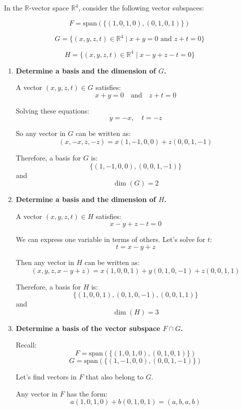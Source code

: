 \documentclass[12pt]{article}
\begin{document}
\begin{answerbox}
In the $ \mathbb{R} $-vector space $ \mathbb{R}^4 $, consider the following vector subspaces:

$$
F = \text{span}\left(\{(1, 0, 1, 0), (0, 1, 0, 1)\}\right)
$$

$$
G = \{(x, y, z, t) \in \mathbb{R}^4 \mid x + y = 0 \text{ and } z + t = 0 \}
$$

$$
H = \{(x, y, z, t) \in \mathbb{R}^4 \mid x - y + z - t = 0 \}
$$

\begin{enumerate}
    \item \textbf{Determine a basis and the dimension of $ G $.}

    A vector $ (x, y, z, t) \in G $ satisfies:
    $$
    x + y = 0 \quad \text{and} \quad z + t = 0
    $$

    Solving these equations:
    $$
    y = -x, \quad t = -z
    $$

    So any vector in $ G $ can be written as:
    $$
    (x, -x, z, -z) = x(1, -1, 0, 0) + z(0, 0, 1, -1)
    $$

    Therefore, a basis for $ G $ is:
    $$
    \{(1, -1, 0, 0), (0, 0, 1, -1)\}
    $$
    and
    $$
    \dim(G) = 2
    $$

    \item \textbf{Determine a basis and the dimension of $ H $.}

    A vector $ (x, y, z, t) \in H $ satisfies:
    $$
    x - y + z - t = 0
    $$

    We can express one variable in terms of others. Let’s solve for $ t $:
    $$
    t = x - y + z
    $$

    Then any vector in $ H $ can be written as:
    $$
    (x, y, z, x - y + z) = x(1, 0, 0, 1) + y(0, 1, 0, -1) + z(0, 0, 1, 1)
    $$

    Therefore, a basis for $ H $ is:
    $$
    \{(1, 0, 0, 1), (0, 1, 0, -1), (0, 0, 1, 1)\}
    $$
    and
    $$
    \dim(H) = 3
    $$

    \item \textbf{Determine a basis of the vector subspace $ F \cap G $.}

    Recall:
    $$
    F = \text{span}\left(\{(1, 0, 1, 0), (0, 1, 0, 1)\}\right)
    $$
    $$
    G = \text{span}\left(\{(1, -1, 0, 0), (0, 0, 1, -1)\}\right)
    $$

    Let’s find vectors in $ F $ that also belong to $ G $.

    Any vector in $ F $ has the form:
    $$
    a(1, 0, 1, 0) + b(0, 1, 0, 1) = (a, b, a, b)
    $$


\end{enumerate}
\end{answerbox}
\end{document}

